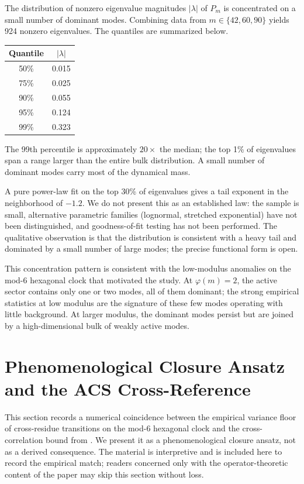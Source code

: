 \documentclass[11pt,a4paper]{article}
\begin{document}
The distribution of nonzero eigenvalue magnitudes $|\lambda|$ of $P_m$ is concentrated on a small number of dominant modes. Combining data from $m \in \{42, 60, 90\}$ yields 924 nonzero eigenvalues. The quantiles are summarized below.

\begin{center}
\begin{tabular}{cc}
\toprule
Quantile & $|\lambda|$ \\
\midrule
50\% & 0.015 \\
75\% & 0.025 \\
90\% & 0.055 \\
95\% & 0.124 \\
99\% & 0.323 \\
\bottomrule
\end{tabular}
\end{center}

The 99th percentile is approximately $20\times$ the median; the top 1\% of eigenvalues span a range larger than the entire bulk distribution. A small number of dominant modes carry most of the dynamical mass.

A pure power-law fit on the top 30\% of eigenvalues gives a tail exponent in the neighborhood of $-1.2$. We do not present this as an established law: the sample is small, alternative parametric families (lognormal, stretched exponential) have not been distinguished, and goodness-of-fit testing has not been performed. The qualitative observation is that the distribution is consistent with a heavy tail and dominated by a small number of large modes; the precise functional form is open.

This concentration pattern is consistent with the low-modulus anomalies on the mod-6 hexagonal clock that motivated the study. At $\varphi(m) = 2$, the active sector contains only one or two modes, all of them dominant; the strong empirical statistics at low modulus are the signature of these few modes operating with little background. At larger modulus, the dominant modes persist but are joined by a high-dimensional bulk of weakly active modes.

\section{Phenomenological Closure Ansatz and the ACS Cross-Reference}
\label{sec:bridge}

This section records a numerical coincidence between the empirical variance floor of cross-residue transitions on the mod-6 hexagonal clock and the cross-correlation bound from \cite{WallaceB}. We present it as a phenomenological closure ansatz, not as a derived consequence. The material is interpretive and is included here to record the empirical match; readers concerned only with the operator-theoretic content of the paper may skip this section without loss.
\end{document}
